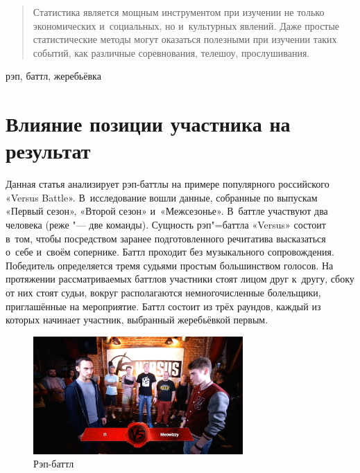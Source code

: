 \documentclass[10pt, twoside]{article}
\begin{document}


\thispagestyle{firststyle}

\maketitle

\begin{abstract}
Статистика является мощным инструментом при изучении не только экономических и~социальных, но и~культурных явлений. Даже простые статистические методы могут оказаться полезными при изучении таких событий, как различные соревнования, телешоу, прослушивания.
\end{abstract}

\begin{keyword}
рэп, баттл, жеребьёвка
\end{keyword}



\section{Влияние позиции участника на результат}

Данная статья анализирует рэп-баттлы на примере популярного российского «Versus Battle». В~исследование вошли данные, собранные по выпускам «Первый сезон», «Второй сезон» и~«Межсезонье». В~баттле участвуют два человека (реже "--- две команды). Сущность рэп"=баттла «Versus» состоит в~том, чтобы посредством заранее подготовленного речитатива высказаться о~себе и~своём сопернике. Баттл проходит без музыкального сопровождения. Победитель определяется тремя судьями простым большинством голосов. На протяжении рассматриваемых баттлов участники стоят лицом друг к~другу, сбоку от них стоят судьи, вокруг располагаются немногочисленные болельщики, приглашённые на мероприятие. Баттл состоит из трёх раундов, каждый из которых начинает участник, выбранный жеребьёвкой первым.

\begin{figure}[htbp]
	\centering
	\includegraphics[width=8cm]{maxresdefault.jpg}
	\caption{Рэп-баттл}
\end{figure}
\end{document}
